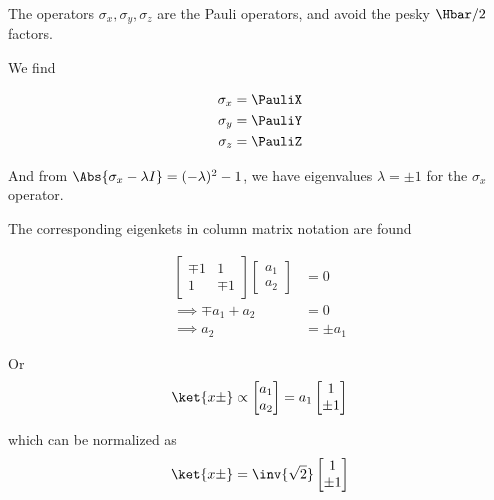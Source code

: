 The operators \(\sigma_x, \sigma_y, \sigma_z\) are the Pauli operators, and avoid the pesky \(\Hbar/2\) factors.

We find

\begin{equation}\label{eqn:PHY356Foct19:2010}
\begin{aligned}
\sigma_x &= \PauliX \\
\sigma_y &= \PauliY \\
\sigma_z &= \PauliZ
\end{aligned}
\end{equation}

And from \(\Abs{\sigma_x - \lambda I} = (-\lambda)^2 -1\), we have eigenvalues \(\lambda = \pm 1\) for the \(\sigma_x\) operator.

The corresponding eigenkets in column matrix notation are found

\begin{equation}\label{eqn:lecture6OrbitalandIntrinsicMomentum:2200}
\begin{aligned}
\begin{bmatrix}
\mp 1 & 1 \\
1 & \mp 1
\end{bmatrix}
\begin{bmatrix}
a_1 \\
a_2
\end{bmatrix}
&= 0 \\
\implies
\mp a_1 + a_2 &= 0 \\
\implies
a_2 &= \pm a_1
\end{aligned}
\end{equation}

Or
\begin{equation}\label{eqn:lecture6OrbitalandIntrinsicMomentum:2220}
\ket{x\pm} \propto
\begin{bmatrix}
a_1 \\
a_2
\end{bmatrix}
=
a_1
\begin{bmatrix}
1 \\
\pm 1
\end{bmatrix}
\end{equation}

which can be normalized as
\begin{equation}\label{eqn:PHY356Foct19:2011}
\ket{x\pm} =
\inv{\sqrt{2}}
\begin{bmatrix}
1 \\
\pm 1
\end{bmatrix}
\end{equation}

